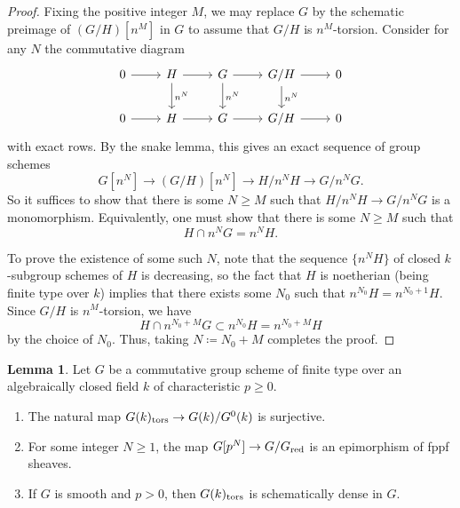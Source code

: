 \documentclass[11pt,reqno]{amsart}
\numberwithin{equation}{section}
\theoremstyle{definition}
\newtheorem{lemma}[thm]{Lemma}
\begin{document}
\begin{proof}
Fixing the positive integer $M$, we may replace $G$ by the schematic preimage of $(G/H)[n^M]$ in $G$ to assume that $G/H$ is $n^M$-torsion. Consider for any $N$ the commutative diagram
\[
\begin{tikzcd}
0 \arrow[r] 
    &H \arrow[r] \arrow[d, "n^N"]
    &G \arrow[r] \arrow[d, "n^N"]
    &G/H \arrow[r] \arrow[d, "n^N"]
    &0 \\
0 \arrow[r]
    &H \arrow[r]
    &G \arrow[r]
    &G/H \arrow[r]
    &0
\end{tikzcd}
\]
with exact rows. By the snake lemma, this gives an exact sequence of group schemes
\[
G[n^N] \to (G/H)[n^N] \to H/n^N H \to G/n^N G.
\]
So it suffices to show that there is some $N \geq M$ such that $H/n^N H \to G/n^N G$ is a monomorphism. Equivalently, one must show that there is some $N \geq M$ such that
\[
H \cap n^N G = n^N H.
\]

To prove the existence of some such $N$, note that the sequence $\{n^N H\}$ of closed $k$-subgroup schemes of $H$ is decreasing, so the fact that $H$ is noetherian (being finite type over $k$) implies that there exists some $N_0$ such that $n^{N_0} H = n^{N_0+1} H$. Since $G/H$ is $n^M$-torsion, we have
\[
H \cap n^{N_0 + M} G \subset n^{N_0} H = n^{N_0 + M} H
\]
by the choice of $N_0$. Thus, taking $N \coloneqq  N_0 + M$ completes the proof.
\end{proof}

\begin{lemma}\label{lemma:torsion-is-dense}
Let $G$ be a commutative group scheme of finite type over an algebraically closed field $k$ of characteristic $p \geq 0$.
\begin{enumerate}
    \item\label{lemma:torsion-is-dense-1} The natural map $G(k)_{\rm{tors}} \to G(k)/G^0(k)$ is surjective.
    \item\label{lemma:torsion-is-dense-2} For some integer $N \geq 1$, the map $G[p^N] \to G/G_{\rm{red}}$ is an epimorphism of fppf sheaves.
    \item\label{lemma:torsion-is-dense-3} If $G$ is smooth and $p > 0$, then $G(k)_{\rm{tors}}$ is schematically dense in $G$.
\end{enumerate}
\end{lemma}
\end{document}
